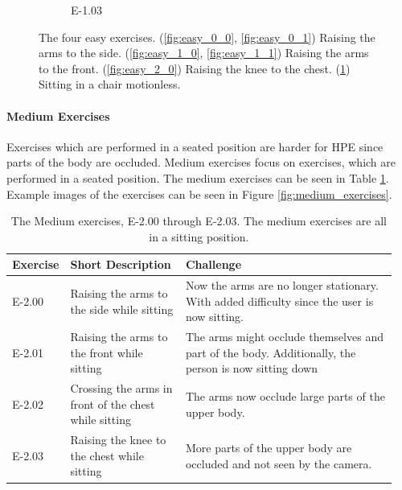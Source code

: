 \begin{figure}[htb]
\begin{subfigure}[b]{0.29\linewidth}
        \caption[]{E-1.03}
        \label{fig:easy_3_0}
    \end{subfigure}
    \caption[Easy Exercises]{The four easy exercises. (\ref{fig:easy_0_0}, \ref{fig:easy_0_1}) Raising the arms to the side. (\ref{fig:easy_1_0}, \ref{fig:easy_1_1}) Raising the arms to the front. (\ref{fig:easy_2_0}) Raising the knee to the chest. (\ref{fig:easy_3_0}) Sitting in a chair motionless.}
    \label{fig:easy_exercises}
  \end{figure}  

\paragraph{Medium Exercises}

Exercises which are performed in a seated position are harder for HPE since parts of the body are occluded. Medium exercises focus on exercises, which are performed in a seated position. The medium exercises can be seen in Table \ref{tab:medium_exercises}. Example images of the exercises can be seen in Figure \ref{fig:medium_exercises}.

\begin{table}[htb]
  \caption[Medium Exercises]{The Medium exercises, E-2.00 through E-2.03. The medium exercises are all in a sitting position.}
  \label{tab:medium_exercises}
  \begin{tabular}{p{0.1\linewidth}p{0.3\linewidth}p{0.55\linewidth}}
  \hline
  \textbf{Exercise}& \textbf{Short Description}                                     & \textbf{Challenge} \\ \hline
  E-2.00   & Raising the arms to the side while sitting            & Now the arms are no longer stationary. With added difficulty since the user is now sitting.         \\
  E-2.01   & Raising the arms to the front while sitting           & The arms might occlude themselves and part of the body. Additionally, the person is now sitting down\\
  E-2.02   & Crossing the arms in front of the chest while sitting & The arms now occlude large parts of the upper body.                                                                                            \\
  E-2.03   & Raising the knee to the chest while sitting           & More parts of the upper body are occluded and not seen by the camera.                              \\ \hline
  \end{tabular}
  \end{table}

